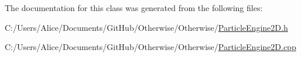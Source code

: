 The documentation for this class was generated from the following files\+:\begin{DoxyCompactItemize}
\item 
C\+:/\+Users/\+Alice/\+Documents/\+Git\+Hub/\+Otherwise/\+Otherwise/\hyperlink{_particle_engine2_d_8h}{Particle\+Engine2\+D.\+h}\item 
C\+:/\+Users/\+Alice/\+Documents/\+Git\+Hub/\+Otherwise/\+Otherwise/\hyperlink{_particle_engine2_d_8cpp}{Particle\+Engine2\+D.\+cpp}\end{DoxyCompactItemize}
